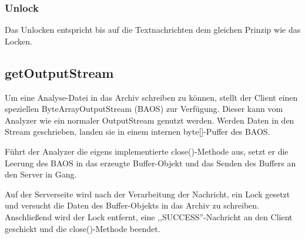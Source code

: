 \subsubsection{Unlock}

Das Unlocken entspricht bis auf die Textnachrichten dem gleichen Prinzip wie das Locken.


\subsection {getOutputStream}

Um eine Analyse-Datei in das Archiv schreiben zu können, stellt der Client einen speziellen ByteArrayOutputStream (BAOS) zur Verfügung.
Dieser kann vom Analyzer wie ein normaler OutputStream genutzt werden.
Werden Daten in den Stream geschrieben, landen sie in einem internen byte[]-Puffer des BAOS.

Führt der Analyzer die eigens implementierte close()-Methode aus, setzt er die Leerung des BAOS in das erzeugte Buffer-Objekt und das Senden des Buffers an den Server in Gang.

Auf der Serverseite wird nach der Verarbeitung der Nachricht, ein Lock gesetzt und versucht die Daten des Buffer-Objekts in das Archiv zu schreiben.
Anschließend wird der Lock entfernt, eine ,,SUCCESS''-Nachricht an den Client geschickt und die close()-Methode beendet.

